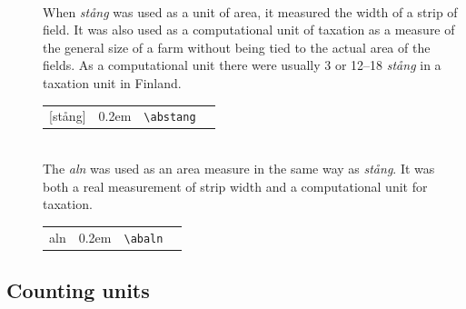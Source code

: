 \documentclass[a4paper]{article}
\newcommand{\samplefont}{\fontsize{16}{16}\abcursivefamily\spaceskip0.2em}
\newcommand{\sample}[1]{{\samplefont #1 \strut}}
\newcommand{\ltxncmd}[1]{\texttt{\textbackslash{}#1}}
\begin{document}
\begin{description}
\item [\sample{\abstang} \emph{stång}, \emph{tanko}] \mbox{} \\
  When \emph{stång} was used as a unit of area, it measured the width
  of a strip of field. It was also used as a computational unit of
  taxation as a measure of the general size of a farm without being
  tied to the actual area of the fields. As a computational unit there
  were usually 3 or 12–18 \emph{stång} in a taxation unit in Finland.
  \begin{center}
    \begin{tabular}{llll}
      {}[stång] & \sample{\abstang} & \ltxncmd{abstang} \\
    \end{tabular}
  \end{center}

\item [\sample{aln} \emph{aln}, \emph{kyynärä}] \mbox{} \\
  The \emph{aln} was used as an area measure in the same way as
  \emph{stång}. It was both a real measurement of strip width and a
  computational unit for taxation. 
  \begin{center}
    \begin{tabular}{llll}
      {}aln & \sample{\abaln} & \ltxncmd{abaln} \\
    \end{tabular}
  \end{center}
\end{description}




\subsection{Counting units}
\end{document}
